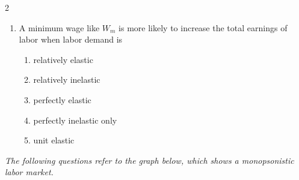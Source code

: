 \documentclass[10pt]{article}
\newenvironment{choiceslist}
  {\begin{enumerate}[label=(\Alph*), leftmargin=1.55em, itemsep=0.1em, topsep=0.15em, parsep=0pt]}
  {\end{enumerate}}
\newenvironment{stimulus}
  {\begin{center}\begin{minipage}{0.97\columnwidth}\footnotesize\itshape\setlength{\tabcolsep}{3pt}\renewcommand{\arraystretch}{0.96}}
  {\end{minipage}\end{center}}
\begin{document}
\begin{multicols*}{2}
\begin{enumerate}[resume*=curveq, leftmargin=*, itemsep=0.8em, topsep=0.18em, parsep=0pt]
\begin{choiceslist}
\item $W_1 \cdot Q_1$
\item $W_1 \cdot Q_d$
\item $W_m \cdot Q_d$
\item $W_m \cdot Q_s$
\item $W_m(Q_s-Q_d)$
\end{choiceslist}
\item A minimum wage like $W_m$ is more likely to increase the total earnings of labor when labor demand is
\begin{choiceslist}
\item relatively elastic
\item relatively inelastic
\item perfectly elastic
\item perfectly inelastic only
\item unit elastic
\end{choiceslist}
\end{enumerate}
\begin{stimulus}
The following questions refer to the graph below, which shows a monopsonistic labor market.


\end{stimulus}
\end{multicols*}
\end{document}
